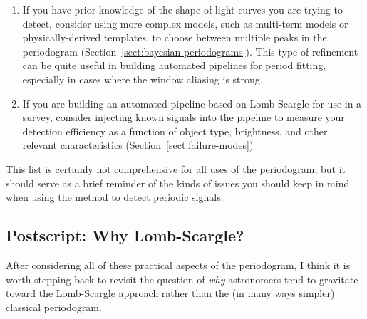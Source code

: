 \documentclass[preprint]{aastex}
\newcommand{\fig}[1]{Figure~\ref{fig:#1}}
\newcommand{\Sect}[1]{Section~\ref{sect:#1}}
\newcommand{\sect}[1]{\Sect{#1}}
\newcommand{\sectlabel}[1]{\label{sect:#1}}
\begin{document}
\begin{enumerate}
    multiple maxima and plot the phased light curve at each.
    If there is indication that the sinusoidal model under-fits the data
    (cf. \fig{binary-multiterm}) then consider
    re-fitting with a multi-term Fourier model (\sect{multiterm}).
  \item If you have prior knowledge of the shape of light curves you are
    trying to detect, consider using more complex models, such as multi-term
    models or physically-derived templates, to choose between
    multiple peaks in the periodogram (\sect{bayesian-periodograms}).
    This type of refinement can be quite useful in building automated
    pipelines for period fitting, especially in cases where the window
    aliasing is strong.
  \item If you are building an automated pipeline based on Lomb-Scargle for
    use in a survey, consider injecting known signals into the pipeline to
    measure your detection efficiency as a function of object type, brightness,
    and other relevant characteristics (\sect{failure-modes})
\end{enumerate}
This list is certainly not comprehensive for all uses of the periodogram, but
it should serve as a brief reminder of the kinds of issues you should keep
in mind when using the method to detect periodic signals.


\subsection{Postscript: Why Lomb-Scargle?}
\sectlabel{postscript}
After considering all of these practical aspects of the periodogram,
I think it is worth stepping back to
revisit the question of {\it why} astronomers tend to gravitate toward the
Lomb-Scargle approach rather than the (in many ways simpler) classical
periodogram.
\end{document}
